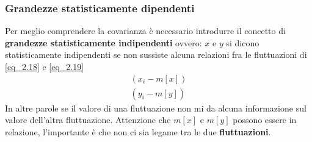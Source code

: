 \documentclass[11pt,a4paper]{book}
\let\oldsqrt\sqrt
\def\sqrt{\mathpalette\DHLhksqrt}
\def\DHLhksqrt#1#2{%
\setbox0=\hbox{$#1\oldsqrt{#2\,}$}\dimen0=\ht0
\advance\dimen0-0.2\ht0
\setbox2=\hbox{\vrule height\ht0 depth -\dimen0}%
{\box0\lower0.4pt\box2}}
\begin{document}
\begin{itemize}
\subsubsection{Grandezze statisticamente dipendenti} 
Per meglio comprendere la covarianza è necessario introdurre il concetto di \textbf{grandezze statisticamente indipendenti} ovvero: $ x $ e $ y $ si dicono statisticamente indipendenti se non sussiste alcuna relazioni fra le fluttuazioni di \eqref{eq_2.18} e \eqref{eq_2.19}
\begin{eqnarray}
(x_i -m[x]) \label{eq_2.18} \\ 
(y_i - m[y]) \label{eq_2.19}
\end{eqnarray}
In altre parole se il valore di una fluttuazione non mi da alcuna informazione sul valore dell'altra fluttuazione. Attenzione che $ m[x] $ e $ m[y] $ possono essere in relazione, l'importante è che non ci sia legame tra le due \textbf{fluttuazioni}. 


\end{itemize}
\end{document}
